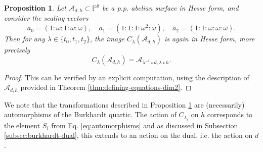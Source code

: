 \documentclass[11pt]{amsart}
\newtheorem{proposition}[theorem]{Proposition}
\theoremstyle{definition}
\newcommand{\A}{\mathcal{A}}
\newcommand{\PP}{\mathbb{P}}
\begin{document}
	\begin{proposition}\label{prop:symplectic-transformation-1}
		Let $\A_{d,h} \subset \PP^8$ be a p.p. abelian surface in Hesse form, and consider the scaling vectors
		\[
		a_0 = (1 : \omega : 1 : \omega : \omega), \quad 
		a_1 = (1 : 1 : 1 : \omega^2 : \omega), \quad 
		a_2 = (1 : 1 : \omega : \omega : \omega).
		\]
		Then for any $\lambda \in \{t_0,t_1,t_2\} $, the image $C_\lambda(\A_{d,h})$ is again in Hesse form, more precisely
		\[
		C_{\lambda}(\A_{d,h}) = \A_{\lambda^{-1} \star d, \lambda \star h}.
		\]
		
		
	\end{proposition}
	
	\begin{proof}
		This can be verified by an explicit computation, using the description of $\A_{d,h}$ provided in Theorem \ref{thm:defining-equations-dim2}.
	\end{proof}
	
	We note that the transformations described in Proposition \ref{prop:symplectic-transformation-1} are (necessarily) automorphisms of the Burkhardt quartic. The action of $C_{\lambda_i}$ on $h$ corresponds to the element $S_i$ from Eq. \ref{eq:automorphisms} and as discussed in Subsection \ref{subsec:burkhardt-dual}, this extends to an action on the dual, i.e. the action on $d$. 
	
\end{document}
